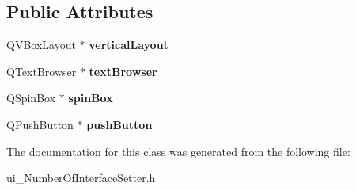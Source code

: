 \subsection*{Public Attributes}
\begin{DoxyCompactItemize}
\item 
\hypertarget{class_ui___number_of_interface_setter_a4b6013e991a33921c5bc998b0393acf1}{Q\-V\-Box\-Layout $\ast$ {\bfseries vertical\-Layout}}\label{class_ui___number_of_interface_setter_a4b6013e991a33921c5bc998b0393acf1}

\item 
\hypertarget{class_ui___number_of_interface_setter_a7ee3a614adbba097ed866fc53d0ea7f1}{Q\-Text\-Browser $\ast$ {\bfseries text\-Browser}}\label{class_ui___number_of_interface_setter_a7ee3a614adbba097ed866fc53d0ea7f1}

\item 
\hypertarget{class_ui___number_of_interface_setter_a35a3bfb1955e1a1fbc4f725831c1a45a}{Q\-Spin\-Box $\ast$ {\bfseries spin\-Box}}\label{class_ui___number_of_interface_setter_a35a3bfb1955e1a1fbc4f725831c1a45a}

\item 
\hypertarget{class_ui___number_of_interface_setter_aef34498d3821d2e561d6ddc3b5b494de}{Q\-Push\-Button $\ast$ {\bfseries push\-Button}}\label{class_ui___number_of_interface_setter_aef34498d3821d2e561d6ddc3b5b494de}

\end{DoxyCompactItemize}


The documentation for this class was generated from the following file\-:\begin{DoxyCompactItemize}
\item 
ui\-\_\-\-Number\-Of\-Interface\-Setter.\-h\end{DoxyCompactItemize}
